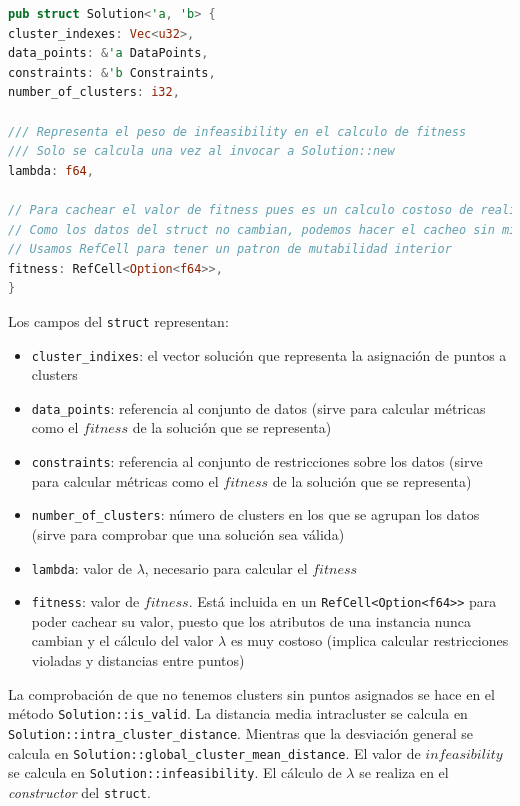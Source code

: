 \documentclass[11pt]{article}
\begin{document}
\begin{lstlisting}[language=Rust, style=Boxed]
pub struct Solution<'a, 'b> {
cluster_indexes: Vec<u32>,
data_points: &'a DataPoints,
constraints: &'b Constraints,
number_of_clusters: i32,

/// Representa el peso de infeasibility en el calculo de fitness
/// Solo se calcula una vez al invocar a Solution::new
lambda: f64,

// Para cachear el valor de fitness pues es un calculo costoso de realizar
// Como los datos del struct no cambian, podemos hacer el cacheo sin miedo
// Usamos RefCell para tener un patron de mutabilidad interior
fitness: RefCell<Option<f64>>,
}
\end{lstlisting}

Los campos del \lstinline{struct} representan:

\begin{itemize}
\item \lstinline{cluster_indixes}: el vector solución que representa la asignación de puntos a clusters
\item \lstinline{data_points}: referencia al conjunto de datos (sirve para calcular métricas como el $fitness$ de la solución que se representa)
\item \lstinline{constraints}: referencia al conjunto de restricciones sobre los datos (sirve para calcular métricas como el $fitness$ de la solución que se representa)
\item \lstinline{number_of_clusters}: número de clusters en los que se agrupan los datos (sirve para comprobar que una solución sea válida)
\item \lstinline{lambda}: valor de $\lambda$, necesario para calcular el $fitness$
\item \lstinline{fitness}: valor de $fitness$. Está incluida en un \lstinline{RefCell<Option<f64>>} para poder cachear su valor, puesto que los atributos de una instancia nunca cambian y el cálculo del valor $\lambda$ es muy costoso (implica calcular restricciones violadas y distancias entre puntos)
\end{itemize}

La comprobación de que no tenemos clusters sin puntos asignados se hace en el método \lstinline{Solution::is_valid}. La distancia media intracluster se calcula en \lstinline{Solution::intra_cluster_distance}. Mientras que la desviación general se calcula en \lstinline{Solution::global_cluster_mean_distance}. El valor de $infeasibility$ se calcula en \lstinline{Solution::infeasibility}. El cálculo de $\lambda$ se realiza en el \emph{constructor} del \lstinline{struct}.
\end{document}
